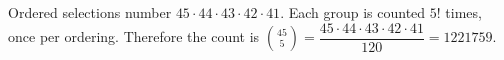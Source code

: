 Ordered selections number $45\cdot 44\cdot 43\cdot 42\cdot 41$. Each group is counted $5!$ times, once per ordering. Therefore the count is $\binom{45}{5}=\dfrac{45\cdot 44\cdot 43\cdot 42\cdot 41}{120}=\boxed{1221759}$.
